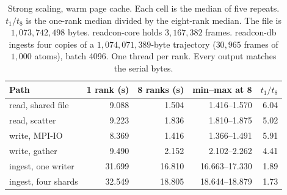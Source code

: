 \begin{table}[ht]
\centering
\small
\caption{Strong scaling, warm page cache. Each cell is the median of five repeats. $t_1/t_8$ is the one-rank median divided by the eight-rank median. The file is $1{,}073{,}742{,}498$ bytes. readcon-core holds $3{,}167{,}382$ frames. readcon-db ingests four copies of a $1{,}074{,}071{,}389$-byte trajectory ($30{,}965$ frames of $1{,}000$ atoms), batch 4096. One thread per rank. Every output matches the serial bytes.}
\label{tab:mpi-strong}
\begin{tabular}{lrrrr}
\toprule
Path & 1 rank (s) & 8 ranks (s) & min--max at 8 & $t_1/t_8$ \\
\midrule
read, shared file & 9.088 & 1.504 & 1.416--1.570 & 6.04 \\
read, scatter & 9.223 & 1.836 & 1.810--1.875 & 5.02 \\
write, MPI-IO & 8.369 & 1.416 & 1.366--1.491 & 5.91 \\
write, gather & 9.490 & 2.152 & 2.102--2.262 & 4.41 \\
ingest, one writer & 31.699 & 16.810 & 16.663--17.330 & 1.89 \\
ingest, four shards & 32.549 & 18.805 & 18.644--18.879 & 1.73 \\
\bottomrule
\end{tabular}
\end{table}
